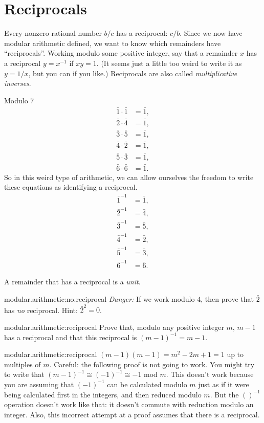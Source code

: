 \section{Reciprocals}
Every nonzero rational number \(b/c\) has a reciprocal: \(c/b\).
Since we now have modular arithmetic defined, we want to know which remainders have ``reciprocals''.
Working modulo some positive integer, say that a remainder \(x\) has a reciprocal \(y=x^{-1}\) if \(xy=1\).
(It seems just a little too weird to write it as \(y=1/x\), but you can if you like.)
Reciprocals are also called \emph{multiplicative inverses}.
\begin{example}
Modulo \(7\)
\begin{align*}
\bar{1} \cdot \bar{1} &= \bar{1}, \\
\bar{2} \cdot \bar{4} &= \bar{1}, \\
\bar{3} \cdot \bar{5} &= \bar{1}, \\
\bar{4} \cdot \bar{2} &= \bar{1}, \\
\bar{5} \cdot \bar{3} &= \bar{1}, \\
\bar{6} \cdot \bar{6} &= \bar{1}.
\end{align*}
So in this weird type of arithmetic, we can allow ourselves the freedom to write these equations as identifying a reciprocal.
\begin{align*}
\bar{1}^{-1} &= \bar{1}, \\
\bar{2}^{-1} &= \bar{4}, \\
\bar{3}^{-1} &= \bar{5}, \\
\bar{4}^{-1} &= \bar{2}, \\
\bar{5}^{-1} &= \bar{3}, \\
\bar{6}^{-1} &= \bar{6}.
\end{align*}
\end{example}
A remainder that has a reciprocal is a \emph{unit}.
\begin{problem}{modular.arithmetic:no.reciprocal}
\emph{Danger:} If we work modulo \(4\), then prove that \(\bar{2}\) has \emph{no} reciprocal.
Hint: \(\bar{2}^2=0\).
\end{problem}
\begin{problem}{modular.arithmetic:reciprocal}
Prove that, modulo any positive integer \(m\), \(m-1\) has a reciprocal and that this reciprocal is \((m-1)^{-1}=m-1\).
\end{problem}
\begin{answer}{modular.arithmetic:reciprocal}
\((m-1)(m-1)=m^2-2m+1=1\) up to multiples of \(m\).
Careful: the following proof is not going to work. You might try to write that \((m-1)^{-1}\cong (-1)^{-1}\cong -1\) mod \(m\).
This doesn't work because you are assuming that \((-1)^{-1}\) can be calculated modulo \(m\) just as if it were being calculated first in the integers, and then reduced modulo \(m\). But the \(()^{-1}\) operation doesn't work like that: it doesn't commute with reduction modulo an integer.
Also, this incorrect attempt at a proof assumes that there is a reciprocal.
\end{answer}
